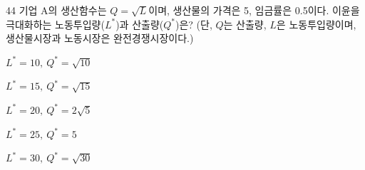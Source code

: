 \begin{question}{44}
기업 A의 생산함수는 $Q=\sqrt{L}$이며, 생산물의 가격은 5, 임금률은 0.5이다. 이윤을 극대화하는 노동투입량($L^*$)과 산출량($Q^*$)은? (단, $Q$는 산출량, $L$은 노동투입량이며, 생산물시장과 노동시장은 완전경쟁시장이다.)
\begin{choices}
  \item $L^*=10,\ Q^*=\sqrt{10}$
  \item $L^*=15,\ Q^*=\sqrt{15}$
  \item $L^*=20,\ Q^*=2\sqrt{5}$
  \item $L^*=25,\ Q^*=5$
  \item $L^*=30,\ Q^*=\sqrt{30}$
\end{choices}
\end{question}
